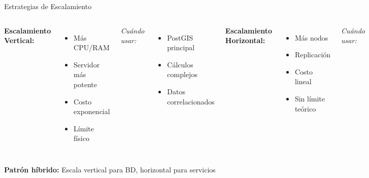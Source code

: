 \documentclass[10pt,aspectratio=169]{beamer}
\begin{document}
\begin{frame}{Estrategias de Escalamiento}
    \begin{columns}[T]
        \textbf{Escalamiento Vertical:}
        \begin{itemize}
            \item \faArrowUp\space Más CPU/RAM
            \item \faServer\space Servidor más potente
            \item \faDollarSign\space Costo exponencial
            \item \faExclamationTriangle\space Límite físico
        \end{itemize}
        
        \textit{Cuándo usar:}
        \begin{itemize}
            \item PostGIS principal
            \item Cálculos complejos
            \item Datos correlacionados
        \end{itemize}
        
        \textbf{Escalamiento Horizontal:}
        \begin{itemize}
            \item \faArrowsAltH\space Más nodos
            \item \faClone\space Replicación
            \item \faChartLine\space Costo lineal
            \item \faInfinity\space Sin límite teórico
        \end{itemize}
        
        \textit{Cuándo usar:}
        \begin{itemize}
            \item APIs stateless
            \item Procesamiento paralelo
            \item Cache distribuido
        \end{itemize}
    \end{columns}
    
    \vspace{0.5cm}
    \begin{tcolorbox}[colframe=blue!70,colback=blue!10]
        \centering\faLightbulb\space \textbf{Patrón híbrido:} Escala vertical para BD, horizontal para servicios
    \end{tcolorbox}
\end{frame}
\end{document}
